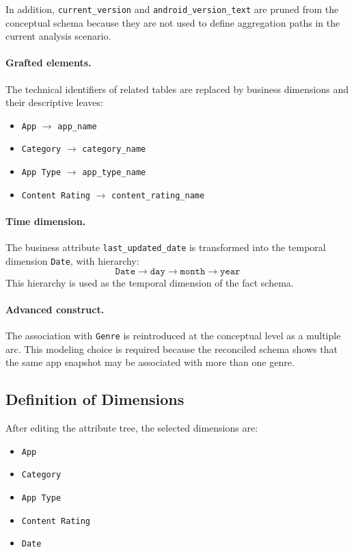 \documentclass[11pt,a4paper]{article}
\begin{document}
In addition, \texttt{current\_version} and \texttt{android\_version\_text} are pruned from the conceptual schema because they are not used to define aggregation paths in the current analysis scenario.

\paragraph{Grafted elements.}
The technical identifiers of related tables are replaced by business dimensions and their descriptive leaves:
\begin{itemize}[leftmargin=1.5em]
    \item \texttt{App} $\rightarrow$ \texttt{app\_name}
    \item \texttt{Category} $\rightarrow$ \texttt{category\_name}
    \item \texttt{App Type} $\rightarrow$ \texttt{app\_type\_name}
    \item \texttt{Content Rating} $\rightarrow$ \texttt{content\_rating\_name}
\end{itemize}

\paragraph{Time dimension.}
The business attribute \texttt{last\_updated\_date} is transformed into the temporal dimension \texttt{Date}, with hierarchy:
\[
\texttt{Date} \rightarrow \texttt{day} \rightarrow \texttt{month} \rightarrow \texttt{year}
\]
This hierarchy is used as the temporal dimension of the fact schema.

\paragraph{Advanced construct.}
The association with \texttt{Genre} is reintroduced at the conceptual level as a multiple arc. This modeling choice is required because the reconciled schema shows that the same app snapshot may be associated with more than one genre.

\subsection{Definition of Dimensions}
After editing the attribute tree, the selected dimensions are:
\begin{itemize}[leftmargin=1.5em]
    \item \texttt{App}
    \item \texttt{Category}
    \item \texttt{App Type}
    \item \texttt{Content Rating}
    \item \texttt{Date}
\end{itemize}
\end{document}
